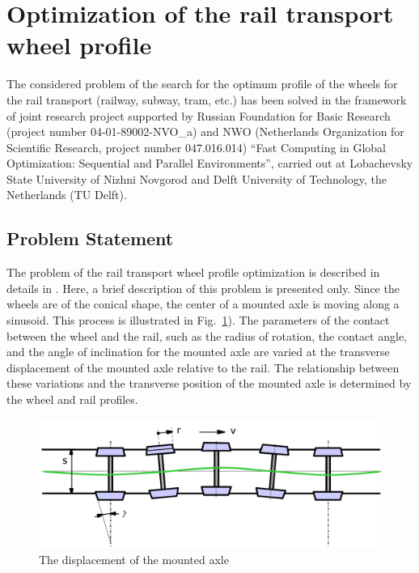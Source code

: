 
\section{Optimization of the rail transport wheel profile}

The considered problem of the search for the optimum profile of the wheels for the rail transport (railway, subway, tram, etc.) has been solved in the framework of joint research project supported by Russian Foundation for Basic Research (project number 04-01-89002-NVO\_a) and NWO (Netherlands Organization for Scientific Research, project number 047.016.014)  ``Fast Computing in Global Optimization: Sequential and Parallel Environments'', carried out at Lobachevsky State University of Nizhni Novgorod and Delft University of Technology, the Netherlands (TU Delft).

\subsection{Problem Statement}

The problem of the rail transport wheel profile optimization is described in details in \cite{8_Markine2005,8_Markine2007}. Here, a brief description of this problem is presented only. Since the wheels are of the conical shape, the center of a mounted axle is moving along a sinusoid. This process is illustrated in Fig.~\ref{8_fig_1}). The parameters of the contact between the wheel and the rail, such as the radius of rotation, the contact angle, and the angle of inclination for the mounted axle are varied at the transverse displacement of the mounted axle relative to the rail. The relationship between these variations and the transverse position of the mounted axle is determined by the wheel and rail profiles.

\begin{figure}[t]
\includegraphics[width=0.9\linewidth]{figures/8_1.png}
\caption{The displacement of the mounted axle}
\label{8_fig_1}     
\end{figure}

